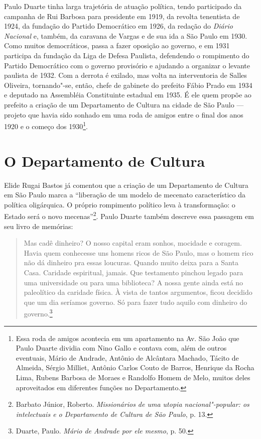 Paulo Duarte tinha larga trajetória de atuação política, tendo
participado da campanha de Rui Barbosa para presidente em 1919, da
revolta tenentista de 1924, da fundação do Partido Democrático em 1926,
da redação do \emph{Diário Nacional} e, também, da caravana de Vargas e
de sua ida a São Paulo em 1930. Como muitos democráticos, passa a fazer
oposição ao governo, e em 1931 participa da fundação da Liga de Defesa
Paulista, defendendo o rompimento do Partido Democrático com o governo
provisório e ajudando a organizar o levante paulista de 1932. Com a
derrota é exilado, mas volta na interventoria de Salles Oliveira,
tornando"-se, então, chefe de gabinete do prefeito Fábio Prado em 1934 e
deputado na Assembléia Constituinte estadual em 1935. É ele quem propõe
ao prefeito a criação de um Departamento de Cultura na cidade de São
Paulo --- projeto que havia sido sonhado em uma roda de amigos entre o
final dos anos 1920 e o começo dos 1930\footnote{Essa roda de amigos
  acontecia em um apartamento na Av. São João que Paulo Duarte dividia
  com Nino Gallo e contava com, além de outros eventuais, Mário de
  Andrade, Antônio de Alcântara Machado, Tácito de Almeida, Sérgio
  Milliet, Antônio Carlos Couto de Barros, Henrique da Rocha Lima,
  Rubens Barbosa de Moraes e Randolfo Homem de Melo, muitos deles
  aproveitados em diferentes funções no Departamento.}.

\section*{O Departamento de Cultura}

Elide Rugai Bastos já comentou que a criação de um Departamento de
Cultura em São Paulo marca a ``liberação de um modelo de mecenato
característico da política oligárquica. O próprio rompimento político
leva à transformação: o Estado será o novo mecenas''\footnote{Barbato
  Júnior, Roberto. \emph{Missionários de uma utopia nacional"-popular: os
  intelectuais e o Departamento de Cultura de São Paulo}, p. 13.}. Paulo
Duarte também descreve essa passagem em seu livro de memórias:

\begin{quote}
Mas cadê dinheiro? O nosso capital eram sonhos, mocidade e coragem.
Havia quem conhecesse uns homens ricos de São Paulo, mas o homem rico
não dá dinheiro pra essas loucuras. Quando muito deixa para a Santa
Casa. Caridade espiritual, jamais. Que testamento pinchou legado para
uma universidade ou para uma biblioteca? A nossa gente ainda está no
paleolítico da caridade física. À vista de tantos argumentos, ficou
decidido que um dia seríamos governo. Só para fazer tudo aquilo com
dinheiro do governo.\footnote{Duarte, Paulo. \emph{Mário de Andrade por
  ele mesmo}, p. 50.}
\end{quote}

